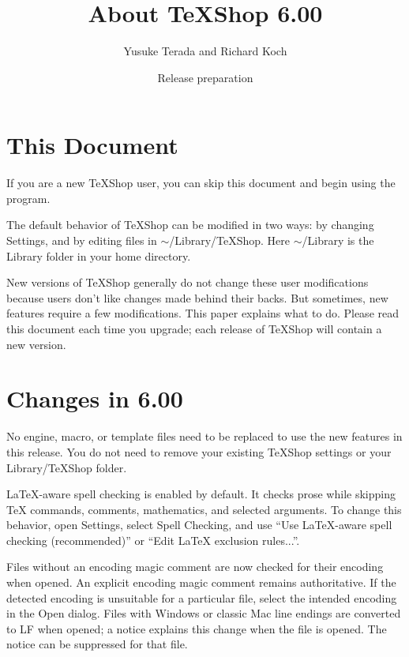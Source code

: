\documentclass[11pt, oneside]{amsart}
\title{About TeXShop 6.00}
\author{Yusuke Terada and Richard Koch}
\date{Release preparation}
\begin{document}
\maketitle

\thispagestyle{empty}
\vspace{-.3in}
\section{This Document}

If you are a new TeXShop user, you can skip this document and begin using the program.

The default behavior of TeXShop can be modified in two ways: by changing Settings, and by editing files in $\sim$/Library/TeXShop. Here $\sim$/Library is the Library folder in your home directory.

New versions of TeXShop generally do not change these user modifications because users don't like changes made behind their backs. But sometimes, new features require a few modifications. This paper explains what to do.
Please read this document each time you upgrade; each release of TeXShop will contain a new version.

\section{Changes in 6.00}

No engine, macro, or template files need to be replaced to use the new features in this release. You do not need to remove your existing TeXShop settings or your Library/TeXShop folder.

LaTeX-aware spell checking is enabled by default. It checks prose while skipping TeX commands, comments, mathematics, and selected arguments. To change this behavior, open Settings, select Spell Checking, and use ``Use LaTeX-aware spell checking (recommended)'' or ``Edit LaTeX exclusion rules...''.

Files without an encoding magic comment are now checked for their encoding when opened. An explicit encoding magic comment remains authoritative. If the detected encoding is unsuitable for a particular file, select the intended encoding in the Open dialog. Files with Windows or classic Mac line endings are converted to LF when opened; a notice explains this change when the file is opened. The notice can be suppressed for that file.
\end{document}
